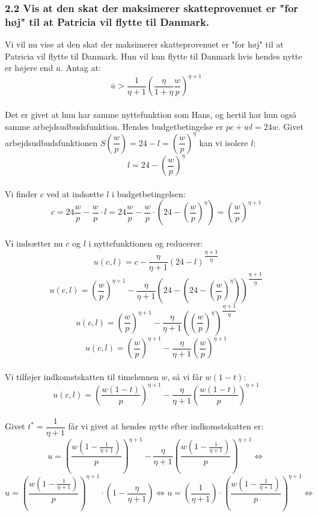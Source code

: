 \documentclass[a4paper, 12pt]{article}
\begin{document}
\subsubsection*{2.2 Vis at den skat der maksimerer skatteprovenuet er "for høj"  til at Patricia vil flytte til Danmark.}
Vi vil nu vise at den skat der maksimerer skatteprovenuet er "for høj" til at Patricia vil flytte til Danmark. Hun vil kun flytte til Danmark hvis hendes nytte er højere end $\overline{u}$. Antag at:
$$\overline{u} > \dfrac{1}{\eta +1} \left( \dfrac{\eta}{1+\eta} \dfrac{w}{p} \right)^{\eta + 1}$$
\\
Det er givet at hun har samme nyttefunktion som Hans, og hertil har hun også samme arbejdsudbudsfunktion. Hendes budgetbetingelse er $pc+wl=24w$. Givet arbejdsudbudsfunktionen $S \left( \dfrac{w}{p} \right)= 24 - l = \left( \dfrac{w}{p}\right) ^{\eta}$ kan vi isolere $l$:
$$l = 24 - \left( \dfrac{w}{p} \right) ^{\eta}$$
\\
Vi finder $c$ ved at indsætte $l$ i budgetbetingelsen:
$$c = 24 \dfrac{w}{p} - \dfrac{w}{p}\cdot l = 24 \dfrac{w}{p} - \dfrac{w}{p}\cdot (24-(\dfrac{w}{p})^{\eta}) = \left( \dfrac{w}{p} \right)^{\eta + 1}$$
\\
Vi indsætter nu $c$ og $l$ i nyttefunktionen og reducerer:
$$u(c,l) = c - \dfrac{\eta}{\eta + 1} (24-l)^{\dfrac{\eta + 1}{\eta}}$$
$$u(c,l) = \left( \dfrac{w}{p} \right)^{\eta + 1}- \dfrac{\eta}{\eta + 1} \left(24- \left(24 - \left( \dfrac{w}{p} \right) ^{\eta} \right) \right)^{\dfrac{\eta + 1}{\eta}}$$
$$u(c,l) = \left( \dfrac{w}{p} \right)^{\eta + 1}- \dfrac{\eta}{\eta + 1} \left( \left( \dfrac{w}{p} \right) ^{\eta} \right)^{\dfrac{\eta + 1}{\eta}}$$
$$u(c,l) = \left( \dfrac{w}{p} \right)^{\eta + 1}- \dfrac{\eta}{\eta + 1} \left(  \dfrac{w}{p} \right) ^{\eta + 1}$$
\\
Vi tilføjer indkomstskatten til timelønnen $w$, så vi får $w(1-t)$:
$$u(c,l) = \left( \dfrac{w(1-t)}{p} \right)^{\eta + 1}- \dfrac{\eta}{\eta + 1} \left(  \dfrac{w(1-t)}{p} \right) ^{\eta + 1}$$
\\
Givet $t^{*} = \dfrac{1}{\eta +1}$ får vi givet at hendes nytte efter indkomstskatten er:
$$u = \left( \dfrac{w \left( 1 - \frac{1}{\eta + 1} \right)}{p} \right)^{\eta + 1} - \dfrac{\eta}{\eta + 1} \left(  \dfrac{w\left( 1 - \frac{1}{\eta + 1} \right)}{p} \right) ^{\eta + 1} \Leftrightarrow$$
$$u = \left( \dfrac{w \left( 1 - \frac{1}{\eta + 1} \right)}{p} \right)^{\eta + 1} \cdot \left( 1-\dfrac{\eta}{\eta + 1} \right) \Leftrightarrow u = \left( \dfrac{1}{\eta + 1} \right) \cdot \left( \dfrac{w \left( 1 - \frac{1}{\eta + 1} \right)}{p} \right)^{\eta + 1} \Leftrightarrow$$
\end{document}
